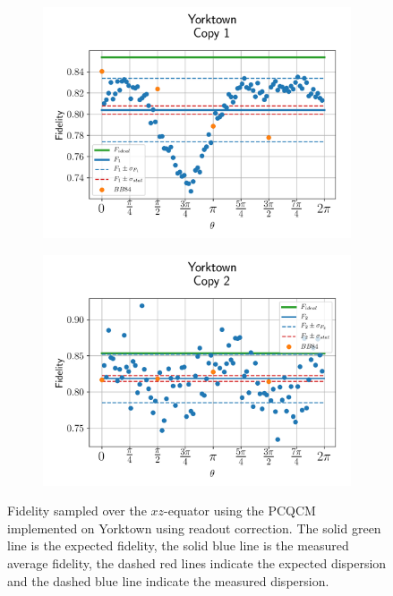 \begin{figure}[H]
  \centering
  \begin{subfigure}{.5\textwidth}
    \centering
    \includegraphics[width=\textwidth]{Figures/PhaseCovariant/IBM/OnlyEquator/results_corrected_ibmqx2_copy1.png}
    \label{fig:pc_corrected_yorktown_equator_1}
  \end{subfigure}%
  \begin{subfigure}{.5\textwidth}
    \centering
    \includegraphics[width=\textwidth]{Figures/PhaseCovariant/IBM/OnlyEquator/results_corrected_ibmqx2_copy2.png}
    \label{fig:pc_corrected_yorktown_equator_2}
  \end{subfigure}
  \vspace{-0.5cm}
  \caption{Fidelity sampled over the $xz$-equator using the PCQCM implemented on Yorktown using readout correction. The solid green line is the expected fidelity, the solid blue line is the measured average fidelity, the dashed red lines indicate the expected dispersion and the dashed blue line indicate the measured dispersion.}
  \label{fig:pc_corrected_yorktown_equator}
\end{figure}


